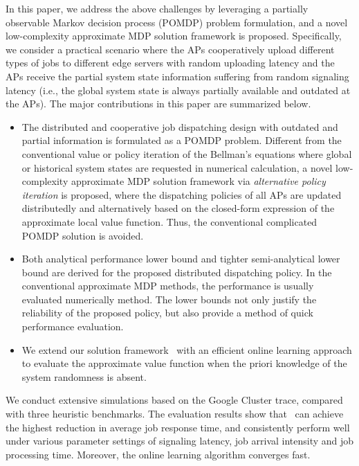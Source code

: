 In this paper, we address the above challenges by leveraging a partially observable Markov decision process (POMDP) problem formulation, and a novel low-complexity approximate MDP solution framework is proposed.
Specifically, we consider a practical scenario where the APs cooperatively upload different types of jobs to different edge servers with random uploading latency and the APs receive the partial system state information suffering from random signaling latency (i.e., the global system state is always partially available and outdated at the APs).
The major contributions in this paper are summarized below.
\begin{itemize}
    \item The distributed and cooperative job dispatching design with outdated and partial information is formulated as a POMDP problem.
    Different from the conventional value or policy iteration of the Bellman's equations where global or historical system states are requested in numerical calculation, a novel low-complexity approximate MDP solution framework via \emph{alternative policy iteration} is proposed, where the dispatching policies of all APs are updated distributedly and alternatively based on the {closed-form expression} of the approximate local value function.
    Thus, the conventional complicated POMDP solution is avoided.
    \item Both analytical performance lower bound and tighter semi-analytical lower bound are derived for the proposed distributed dispatching policy. In the conventional approximate MDP methods, the performance is usually evaluated numerically method.
    The lower bounds not only justify the reliability of the proposed policy, but also provide a method of quick performance evaluation.
    \item We extend our solution framework \algname~with an efficient online learning approach to evaluate the approximate value function when the priori knowledge of the system randomness is absent.
\end{itemize}

We conduct extensive simulations based on the Google Cluster trace, compared with three heuristic benchmarks.
The evaluation results show that \algname~can achieve the highest reduction in average job response time,
and consistently perform well under various parameter settings of signaling latency, job arrival intensity and job processing time. {Moreover, the online learning algorithm converges fast.}

